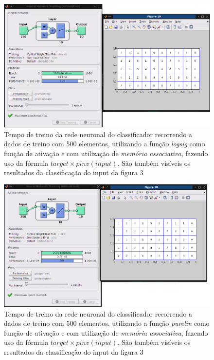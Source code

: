 \documentclass{article}
\begin{document}
\begin{figure}[h]
  \centering
      \includegraphics[scale=0.3]{500_Pinv_Sigmoidal.png}
  \caption{Tempo de treino da rede neuronal do classificador recorrendo a dados de treino com 500 elementos, utilizando a função \emph{logsig} como função de ativação e com utilização de \emph{memória associativa}, fazendo uso da fórmula $target\times pinv(input)$. São também visíveis os resultados da classificação do input da figura 3}
\end{figure}

\begin{figure}[h]
  \centering
      \includegraphics[scale=0.3]{500_Pinv_Linear.png}
  \caption{Tempo de treino da rede neuronal do classificador recorrendo a dados de treino com 500 elementos, utilizando a função \emph{purelin} como função de ativação e com utilização de \emph{memória associativa}, fazendo uso da fórmula $target\times pinv(input)$. São também visíveis os resultados da classificação do input da figura 3}
\end{figure}
\end{document}
